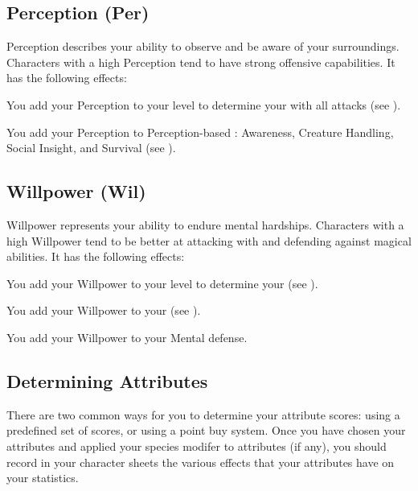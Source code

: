    \subsection{Perception (Per)}\label{Perception}
        {
            Perception describes your ability to observe and be aware of your surroundings.
            Characters with a high Perception tend to have strong offensive capabilities.
            It has the following effects:
            \begin{raggeditemize}
                \item You add your Perception to your level to determine your  with all attacks (see ).
                \item You add your Perception to Perception-based : Awareness, Creature Handling, Social Insight, and Survival (see ).
            \end{raggeditemize}
        }

    \subsection{Willpower (Wil)}\label{Willpower}
        {
            Willpower represents your ability to endure mental hardships.
            Characters with a high Willpower tend to be better at attacking with and defending against magical abilities.
            It has the following effects:
            \begin{raggeditemize}
                \item You add your Willpower to your level to determine your  (see ).
                \item You add your Willpower to your  (see ).
                \item You add your Willpower to your Mental defense.
            \end{raggeditemize}
        }


    \subsection{Determining Attributes}\label{Determining Attributes}
        There are two common ways for you to determine your attribute scores: using a predefined set of scores, or using a point buy system.
        Once you have chosen your attributes and applied your species modifer to attributes (if any), you should record in your character sheets the various effects that your attributes have on your statistics.

